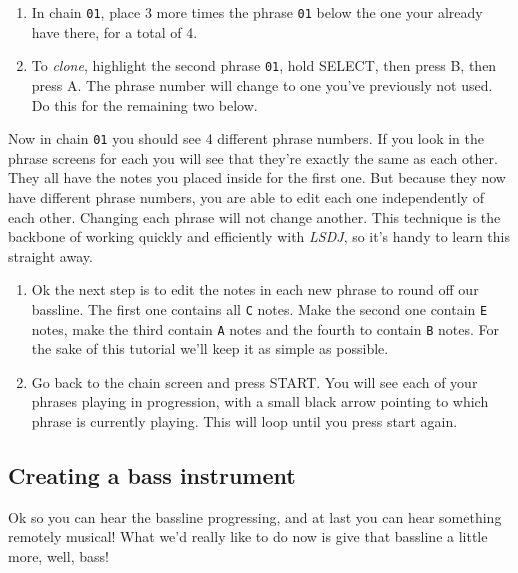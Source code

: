 \documentclass[]{article}
\newcommand{\buttonStyle}[1]{\textsf{#1}\xspace}
\newcommand{\bA}{\buttonStyle{A}}
\newcommand{\bB}{\buttonStyle{B}}
\newcommand{\bStart}{\buttonStyle{{START}}}
\newcommand{\bSelect}{\buttonStyle{{SELECT}}}
\newcommand{\gbtxt}[1]{\texttt{#1}\xspace}
\newcommand{\lsdj}{\textit{LSDJ}\xspace}
\begin{document}
\begin{enumerate}[resume]

\item In chain \gbtxt{01}, place 3 more times the phrase \gbtxt{01} below the one your already have there, for a total of 4.

\item To \textit{clone}, highlight the second phrase \gbtxt{01}, hold \bSelect, then press \bB, then press \bA. The phrase number will change to one you've previously not used. Do this for the remaining two below.

\end{enumerate}

Now in chain \gbtxt{01} you should see 4 different phrase numbers. If you look in the phrase screens for each you will see that they're exactly the same as each other. They all have the notes you placed inside for the first one. But because they now have different phrase numbers, you are able to edit each one independently of each other. Changing each phrase will not change another. This technique is the backbone of working quickly and efficiently with \lsdj, so it's handy to learn this straight away.


\begin{enumerate}[resume]

\item 
Ok the next step is to edit the notes in each new phrase to round off our bassline.
The first one contains all \gbtxt{C} notes. Make the second one contain \gbtxt{E} notes, make the third contain \gbtxt{A} notes and the fourth to contain \gbtxt{B} notes. For the sake of this tutorial we'll keep it as simple as possible.

\item Go back to the chain screen and press \bStart. You will see each of your phrases playing in progression, with a small black arrow pointing to which phrase is currently playing. This will loop until you press start again.

\end{enumerate}


\subsection{Creating a bass instrument}

Ok so you can hear the bassline progressing, and at last you can hear something remotely musical! What we'd really like to do now is give that bassline a little more, well, bass!
\end{document}
